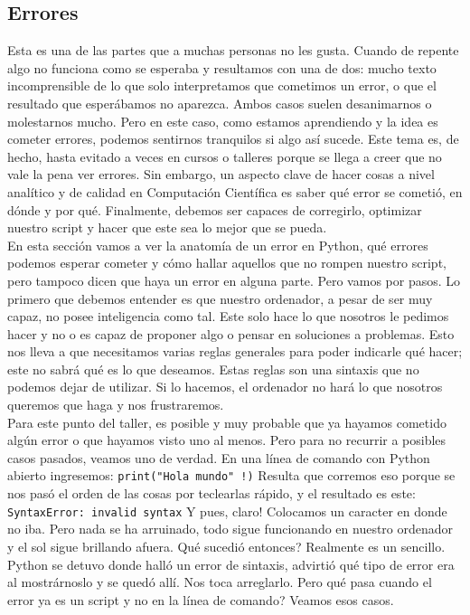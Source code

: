 \documentclass[10pt,letterpaper]{article}
\newcommand{\inlinecode}[1]{
\colorbox{light-gray}{\texttt{#1}}
}
\begin{document}
\subsection{Errores}
Esta es una de las partes que a muchas personas no les gusta. Cuando de repente algo no funciona como se esperaba y resultamos con una de dos: mucho texto incomprensible de lo que solo interpretamos que cometimos un error, o que el resultado que esper\'abamos no aparezca. Ambos casos suelen desanimarnos o molestarnos mucho. Pero en este caso, como estamos aprendiendo y la idea es cometer errores, podemos sentirnos tranquilos si algo as\'i sucede. Este tema es, de hecho, hasta evitado a veces en cursos o talleres porque se llega a creer que no vale la pena ver errores. Sin embargo, un aspecto clave de hacer cosas a nivel anal\'itico y de calidad en Computaci\'on Cient\'ifica es saber qu\'e error se cometi\'o, en d\'onde y por qu\'e. Finalmente, debemos ser capaces de corregirlo, optimizar nuestro script y hacer que este sea lo mejor que se pueda.\\

En esta secci\'on vamos a ver la anatom\'ia de un error en Python, qu\'e errores podemos esperar cometer y c\'omo hallar aquellos que no rompen nuestro script, pero tampoco dicen que haya un error en alguna parte. Pero vamos por pasos. Lo primero que debemos entender es que nuestro ordenador, a pesar de ser muy capaz, no posee inteligencia como tal. Este solo hace lo que nosotros le pedimos hacer y no o es capaz de proponer algo o pensar en soluciones a problemas. Esto nos lleva a que necesitamos varias reglas generales para poder indicarle qu\'e hacer; este no sabr\'a qu\'e es lo que deseamos. Estas reglas son una sintaxis que no podemos dejar de utilizar. Si lo hacemos, el ordenador no har\'a lo que nosotros queremos que haga y nos frustraremos.\\

Para este punto del taller, es posible y muy probable que ya hayamos cometido alg\'un error o que hayamos visto uno al menos. Pero para no recurrir a posibles casos pasados, veamos uno de verdad. En una l\'inea de comando con Python abierto ingresemos: \inlinecode{print("Hola mundo"\ \hspace{-2mm}!)} Resulta que corremos eso porque se nos pas\'o el orden de las cosas por teclearlas r\'apido, y el resultado es este: \inlinecode{\color{red} SyntaxError: invalid syntax} Y pues, claro! Colocamos un caracter en donde no iba. Pero nada se ha arruinado, todo sigue funcionando en nuestro ordenador y el sol sigue brillando afuera. Qu\'e sucedi\'o entonces? Realmente es un sencillo. Python se detuvo donde hall\'o un error de sintaxis, advirti\'o qu\'e tipo de error era al mostr\'arnoslo y se qued\'o all\'i. Nos toca arreglarlo. Pero qu\'e pasa cuando el error ya es un script y no en la l\'inea de comando? Veamos esos casos.\\
\end{document}
